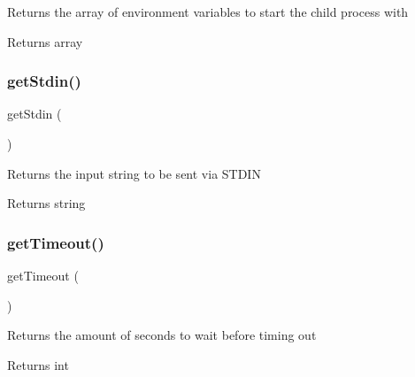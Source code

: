 Returns the array of environment variables to start the child process with

\begin{DoxyReturn}{Returns}
array 
\end{DoxyReturn}
\mbox{\label{class_p_h_p_unit___util___p_h_p_ade85314bc074191bf57b0a76acff7a07}} 
\subsubsection{\texorpdfstring{get\+Stdin()}{getStdin()}}
{\footnotesize\ttfamily get\+Stdin (\begin{DoxyParamCaption}{ }\end{DoxyParamCaption})}

Returns the input string to be sent via S\+T\+D\+IN

\begin{DoxyReturn}{Returns}
string 
\end{DoxyReturn}
\mbox{\label{class_p_h_p_unit___util___p_h_p_abac5019c5daf3a27d739aa3a249fdb31}} 
\subsubsection{\texorpdfstring{get\+Timeout()}{getTimeout()}}
{\footnotesize\ttfamily get\+Timeout (\begin{DoxyParamCaption}{ }\end{DoxyParamCaption})}

Returns the amount of seconds to wait before timing out

\begin{DoxyReturn}{Returns}
int 
\end{DoxyReturn}
\mbox{\label{class_p_h_p_unit___util___p_h_p_a2bdd3292fd85da0f0f30ac8d70bf7ee3}} 
